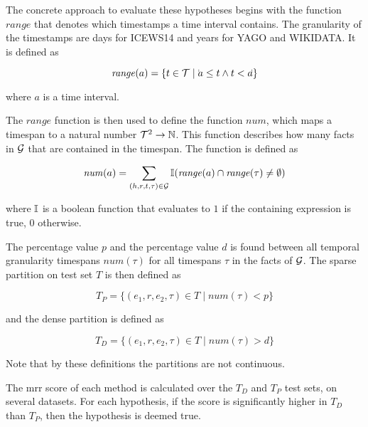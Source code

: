 The concrete approach to evaluate these hypotheses begins with the function $\mathit{range}$ that denotes which timestamps a time interval contains. The granularity of the timestamps are days for ICEWS14 and years for YAGO and WIKIDATA. It is defined as

\begin{equation}
\mathit{range}(a) = \{ t \in \varT \mid \timebegin{a} \leq t \wedge t < \timeend{a} \}
\end{equation}

\noindent
where $a$ is a time interval.

The $\mathit{range}$ function is then used to define the function $\mathit{num}$, which maps a timespan to a natural number $\mathcal{T}^2 \rightarrow \mathbb{N}$. This function describes how many facts in $\mathcal{G}$ that are contained in the timespan. The function is defined as

\begin{equation}
\mathit{num}(a) = \sum\limits_{(h, r, t, \tau) \in \mathcal{G}} \mathbb{I} ( \mathit{range}(a) \cap \mathit{range}(\tau) \neq \emptyset )
\end{equation}

\noindent
where $\mathbb{I}$ is a boolean function that evaluates to $1$ if the containing expression is true, $0$ otherwise.

The  percentage value $p$ and the  percentage value $d$ is found between all temporal granularity timespans $\mathit{num}(\tau)$ for all timespans $\tau$ in the facts of $\mathcal{G}$. The sparse partition on test set $T$ is then defined as

\begin{equation}
T_P = \{ (e_1, r, e_2, \tau) \in T \mid \textit{num}(\tau) < p \}
\end{equation}

\noindent
and the dense partition is defined as

\begin{equation}
T_D = \{ (e_1, r, e_2, \tau) \in T \mid \textit{num}(\tau) > d \}
\end{equation}

\noindent
Note that by these definitions the partitions are not continuous.

The \gls{mrr} score of each method is calculated over the $T_D$ and $T_P$ test sets, on several datasets. For each hypothesis, if the score is significantly higher in $T_D$ than $T_P$, then the hypothesis is deemed true.

\begin{comment}
foreach fact in dataset
    fact_count_i_timespan(fact) >> array
done
sort(array)
median(array)
\end{comment}